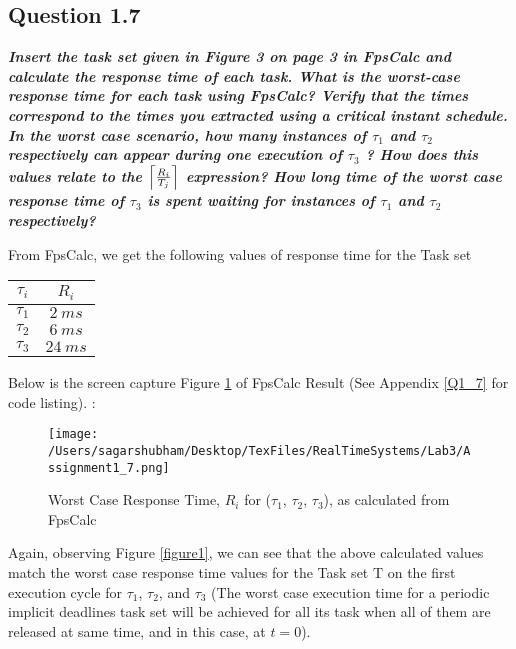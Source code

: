 \documentclass[oneside,a4paper]{article}
\DeclarePairedDelimiter{\ceil}{\lceil}{\rceil}
\newcommand{\Tau}{\mathrm{T}}
\begin{document}
\subsection*{\normalsize{Question 1.7}}
\textit{\textbf{Insert the task set given in Figure 3 on page 3 in FpsCalc and calculate the response time of each task. What is the worst-case response time for each task using FpsCalc? Verify that the times correspond to the times you extracted using a critical instant schedule. In the worst case scenario, how many instances of $\tau_1$ and $\tau_2$ respectively can appear during one execution of $\tau_3$ ? How does this values relate to the $\ceil[\Big]{\frac{R_i}{T_j}}$ expression? How long time of the worst case response time of $\tau_3$ is spent waiting for instances of $\tau_1$ and $\tau_2$ respectively?}}\par
From FpsCalc, we get the following values of response time for the Task set \par
\begin{center}
\begin{tabular}{| c | c |}
\hline
\textbf{$\tau_i$} & \textbf{$R_i$} \\
\hline
$\tau_1$ & $2 \ ms$ \\
$\tau_2$ & $6 \ ms$ \\
$\tau_3$ & $24 \ ms$ \\
\hline
\end{tabular}
\end{center}\par
Below is the screen capture Figure \ref{figure5} of FpsCalc Result (See Appendix \ref{Q1_7} for code listing). :\par
\begin{center}
\begin{figure}[H]
                    \centering
                    \texttt{[image: /Users/sagarshubham/Desktop/TexFiles/RealTimeSystems/Lab3/Assignment1\_7.png]}
                    \caption[Figure for Question 1.7 Part 1]{Worst Case Response Time, $R_i$ for ($\tau_1$, $\tau_2$, $\tau_3$), as calculated from FpsCalc }
                    \label{figure5}        
\end{figure}
\end{center}\par
\pagebreak
Again, observing Figure \ref{figure1}, we can see that the above calculated values match the worst case response time values for the Task set $\Tau$ on the first execution cycle for $\tau_1$, $\tau_2$, and $\tau_3$ (The worst case execution time for a periodic implicit deadlines task set will be achieved for all its task when all of them are released at same time, and in this case, at $t = 0$).\par
\end{document}
